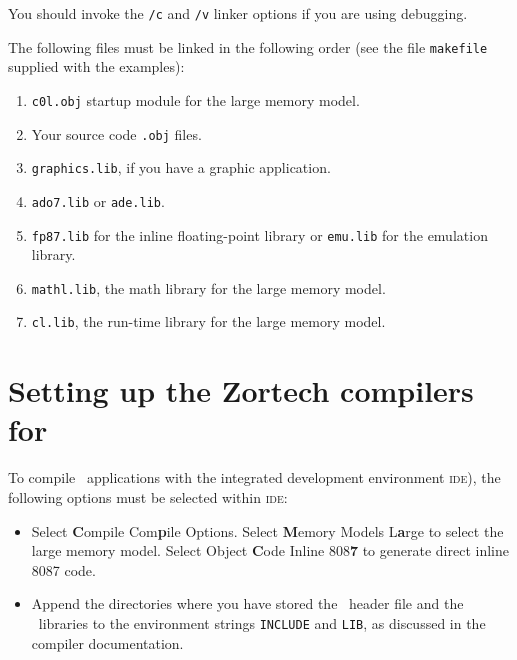\documentclass{admbmanual}
\begin{document}
You should invoke the \texttt{/c} and \texttt{/v} linker options if you are
using debugging.

The following files must be linked in the following order (see the file
\texttt{makefile} supplied with the examples):
\begin{enumerate}
  \item \texttt{c0l.obj} startup module for the large memory model.

  \item Your source code \texttt{.obj} files.

  \item \texttt{graphics.lib}, if you have a graphic application.

  \item \texttt{ado7.lib} or \texttt{ade.lib}.

  \item \texttt{fp87.lib} for the inline floating-point library or
  \texttt{emu.lib} for the emulation library.

  \item \texttt{mathl.lib}, the math library for the large memory model.

  \item \texttt{cl.lib}, the run-time library for the large memory model.
\end{enumerate}

\section{Setting up the Zortech compilers for \scAD}

To compile \scAD\ applications with the integrated development environment
\textsc{ide}), the following options must be selected within \textsc{ide}:
\begin{itemize}
  \item Select {\bf C}ompile Com{\bf p}ile Options. Select {\bf M}emory Models
  L{\bf a}rge to select the large memory model. Select Object {\bf C}ode Inline
  808{\bf 7} to generate direct inline 8087 code.

  \item Append the directories where you have stored the \scAD\ header file and
  the \scAD\ libraries to the environment strings \texttt{INCLUDE} and
  \texttt{LIB}, as discussed in the compiler documentation.
\end{itemize}
\end{document}
